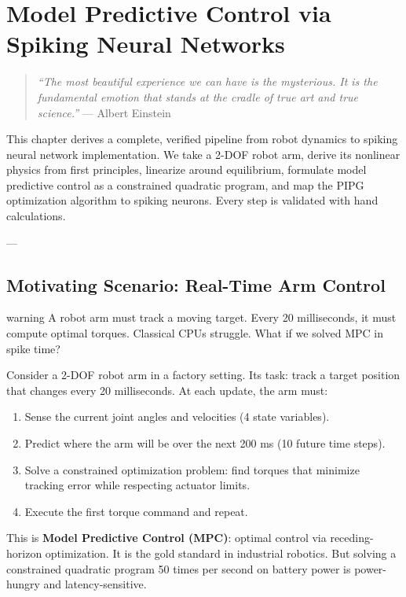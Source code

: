 \chapter{Model Predictive Control via Spiking Neural Networks}
\label{ch:snn-mpc}

\begin{quote}
\textit{``The most beautiful experience we can have is the mysterious. It is the fundamental emotion that stands at the cradle of true art and true science.''}
--- Albert Einstein
\end{quote}

This chapter derives a complete, verified pipeline from robot dynamics to spiking neural network implementation. We take a 2-DOF robot arm, derive its nonlinear physics from first principles, linearize around equilibrium, formulate model predictive control as a constrained quadratic program, and map the PIPG optimization algorithm to spiking neurons. Every step is validated with hand calculations.

---

\section{Motivating Scenario: Real-Time Arm Control}
\begin{block}{warning}
A robot arm must track a moving target. Every 20 milliseconds, it must compute optimal torques. Classical CPUs struggle. What if we solved MPC in spike time?
\end{block}

\label{sec:mpc-motivation}

Consider a 2-DOF robot arm in a factory setting. Its task: track a target position that changes every 20 milliseconds. At each update, the arm must:

\begin{enumerate}
\item Sense the current joint angles and velocities (4 state variables).
\item Predict where the arm will be over the next 200 ms (10 future time steps).
\item Solve a constrained optimization problem: find torques that minimize tracking error while respecting actuator limits.
\item Execute the first torque command and repeat.
\end{enumerate}

This is \textbf{Model Predictive Control (MPC)}: optimal control via receding-horizon optimization. It is the gold standard in industrial robotics. But solving a constrained quadratic program 50 times per second on battery power is power-hungry and latency-sensitive.

